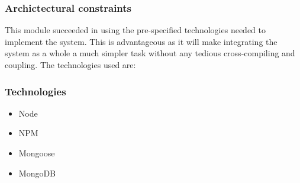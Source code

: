 \begin{flushleft}
\subsubsection{Archictectural constraints}
This module succeeded in using the pre-specified technologies needed to implement the system. This is advantageous as it will make integrating the system as a whole a much simpler task without any tedious cross-compiling and coupling. The technologies used are:

\subsubsection{Technologies}
\begin{itemize}
\item Node
\item NPM
\item Mongoose
\item MongoDB
\end{itemize}

\end{flushleft}